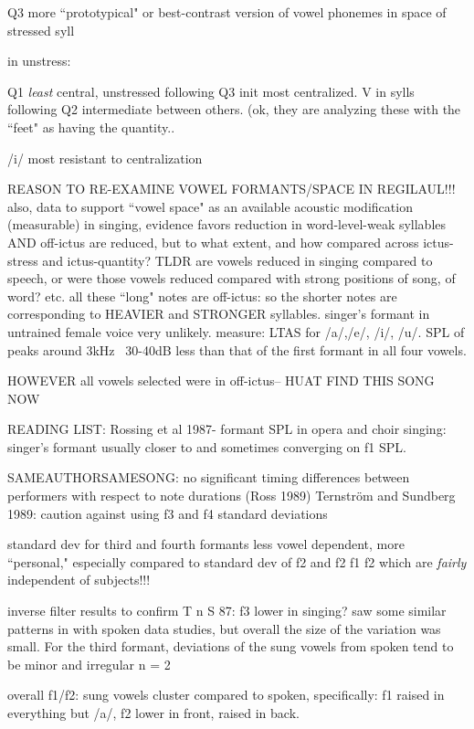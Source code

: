 Q3 more ``prototypical" or best-contrast version of vowel phonemes in space of stressed syll

in unstress: 

Q1 {\it least} central, unstressed following Q3 init most centralized. V in sylls following Q2 intermediate between others. (ok, they are analyzing these with the ``feet" as having the quantity.. 

/i/ most resistant to centralization

\citep{rossFormants90}
REASON TO RE-EXAMINE VOWEL FORMANTS/SPACE IN  REGILAUL!!! 
also, data to support ``vowel space" as an available acoustic modification (measurable) in 
singing, evidence favors reduction in word-level-weak syllables AND off-ictus are reduced, 
but to what extent, and how compared across ictus-stress and ictus-quantity?
TLDR are vowels reduced in singing compared to speech, or were those vowels reduced compared with strong positions of song, of word? etc. 
all these ``long" notes are off-ictus: so the shorter notes are corresponding to HEAVIER and STRONGER syllables. 
singer's formant in untrained female voice very unlikely. measure: LTAS for /a/,/e/, /i/, /u/. SPL of peaks around 3kHz ~30-40dB less than that of the first formant in all four vowels. 



HOWEVER all vowels selected were in off-ictus-- HUAT
FIND THIS SONG NOW

READING LIST: Rossing et al 1987- formant SPL in opera and choir singing: singer's formant usually closer to and sometimes converging on f1 SPL. 

SAMEAUTHORSAMESONG: no significant timing differences between performers with respect to note durations (Ross 1989)
Ternström and Sundberg 1989: caution against using f3 and f4 standard deviations

standard dev for third and fourth formants less vowel dependent, more ``personal," especially compared to standard dev of f2 and f2 f1 f2 which are {\it fairly} independent of subjects!!!


inverse filter results to confirm T n S 87: f3 lower in singing? 
saw some similar patterns in with spoken data studies, but overall the size of the variation was small. For the third formant, deviations of the sung vowels from spoken tend to be minor and irregular  n = 2

overall f1/f2: sung vowels cluster compared to spoken, specifically:
f1 raised in everything but /a/,
f2 lower in front, raised in back. 

